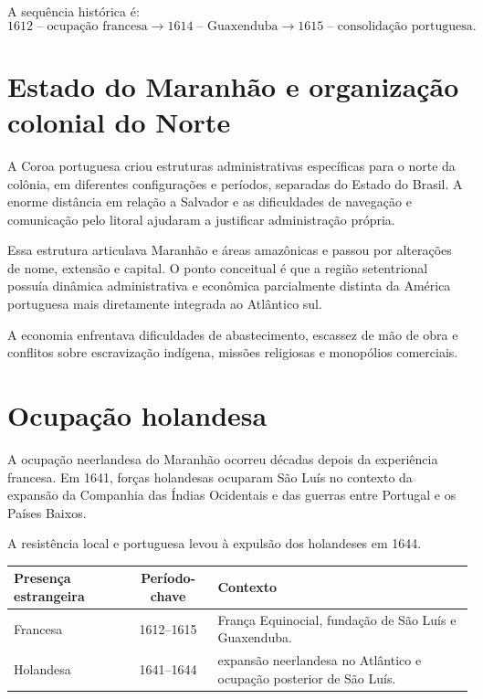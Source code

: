 A sequência histórica é:
\[
1612\;\text{-- ocupação francesa}
\rightarrow
1614\;\text{-- Guaxenduba}
\rightarrow
1615\;\text{-- consolidação portuguesa}.
\]

\section{Estado do Maranhão e organização colonial do Norte}

A Coroa portuguesa criou estruturas administrativas específicas para o norte da colônia, em diferentes configurações e períodos, separadas do Estado do Brasil. A enorme distância em relação a Salvador e as dificuldades de navegação e comunicação pelo litoral ajudaram a justificar administração própria.

Essa estrutura articulava Maranhão e áreas amazônicas e passou por alterações de nome, extensão e capital. O ponto conceitual é que a região setentrional possuía dinâmica administrativa e econômica parcialmente distinta da América portuguesa mais diretamente integrada ao Atlântico sul.

A economia enfrentava dificuldades de abastecimento, escassez de mão de obra e conflitos sobre escravização indígena, missões religiosas e monopólios comerciais.

\section{Ocupação holandesa}

A ocupação neerlandesa do Maranhão ocorreu décadas depois da experiência francesa. Em 1641, forças holandesas ocuparam São Luís no contexto da expansão da Companhia das Índias Ocidentais e das guerras entre Portugal e os Países Baixos.

A resistência local e portuguesa levou à expulsão dos holandeses em 1644.

\begin{table}[ht]
\centering
\small
\begin{tabularx}{\textwidth}{l c X}
\toprule
Presença estrangeira & Período-chave & Contexto \\
\midrule
Francesa & 1612--1615 & França Equinocial, fundação de São Luís e Guaxenduba. \\
Holandesa & 1641--1644 & expansão neerlandesa no Atlântico e ocupação posterior de São Luís. \\
\bottomrule
\end{tabularx}
\end{table}

